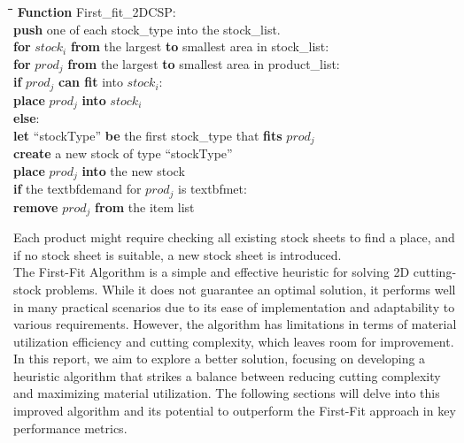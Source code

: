 \documentclass[a4paper]{article}
\begin{document}
    \pagebreak
    \begin{mdframed}[backgroundcolor=black!10]
        \begin{tabbing}
    \hspace{0.5cm}\=\hspace{0.5cm}\=\hspace{0.5cm}\=\hspace{0.5cm}\=\hspace{0.5cm}\=\kill
        \textbf{Function} First\_fit\_2DCSP: \\    
        \> \textbf{push} one of each stock\_type into the stock\_list.\\
        \> \textbf{for} $stock_i$ \textbf{from} the largest \textbf{to} smallest area in stock\_list:\\
        \>\> \textbf{for} $prod_j$ \textbf{from} the largest \textbf{to} smallest area in product\_list:\\
        \>\>\> \textbf{if} $prod_j$ \textbf{can fit} into $stock_i$:\\
        \>\>\>\> \textbf{place} $prod_j$ \textbf{into} $stock_i$\\
        \>\>\> \textbf{else}:\\
        \>\>\>\> \textbf{let} ``stockType'' \textbf{be} the first stock\_type that \textbf{fits} $prod_j$\\
        \>\>\>\> \textbf{create} a new stock of type ``stockType''\\
        \>\>\>\> \textbf{place} $prod_j$ \textbf{into} the new stock\\
        \>\>\> \textbf{if} the textbf{demand} for $prod_j$ is textbf{met}:\\
        \>\>\>\> \textbf{remove} $prod_j$ \textbf{from} the item list
        \end{tabbing}
    \end{mdframed}
    
    \vspace{0.2cm}
    Each product might require checking all existing stock sheets to find a place, and if no stock sheet is suitable, a new stock sheet is introduced.
    \vspace{0.2cm}\\
    The First-Fit Algorithm is a simple and effective heuristic for solving 2D cutting-stock problems. While it does not guarantee an optimal solution, it performs well in many practical scenarios due to its ease of implementation and adaptability to various requirements. However, the algorithm has limitations in terms of material utilization efficiency and cutting complexity, which leaves room for improvement.
    \vspace{0.2cm}\\
    In this report, we aim to explore a better solution, focusing on developing a heuristic algorithm that strikes a balance between reducing cutting complexity and maximizing material utilization. The following sections will delve into this improved algorithm and its potential to outperform the First-Fit approach in key performance metrics.
    
\end{document}
